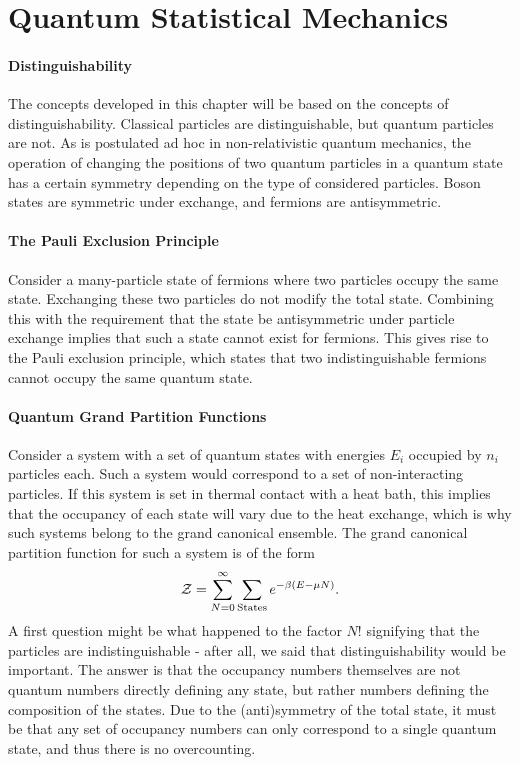 \section{Quantum Statistical Mechanics}

\paragraph{Distinguishability}
The concepts developed in this chapter will be based on the concepts of distinguishability. Classical particles are distinguishable, but quantum particles are not. As is postulated ad hoc in non-relativistic quantum mechanics, the operation of changing the positions of two quantum particles in a quantum state has a certain symmetry depending on the type of considered particles. Boson states are symmetric under exchange, and fermions are antisymmetric.

\paragraph{The Pauli Exclusion Principle}
Consider a many-particle state of fermions where two particles occupy the same state. Exchanging these two particles do not modify the total state. Combining this with the requirement that the state be antisymmetric under particle exchange implies that such a state cannot exist for fermions. This gives rise to the Pauli exclusion principle, which states that two indistinguishable fermions cannot occupy the same quantum state.

\paragraph{Quantum Grand Partition Functions}
Consider a system with a set of quantum states with energies $E_{i}$ occupied by $n_{i}$ particles each. Such a system would correspond to a set of non-interacting particles. If this system is set in thermal contact with a heat bath, this implies that the occupancy of each state will vary due to the heat exchange, which is why such systems belong to the grand canonical ensemble. The grand canonical partition function for such a system is of the form
\begin{align*}
	\mathcal{Z} = \sum\limits_{N = 0}^{\infty}\sum\limits_{\text{States}}e^{-\beta(E - \mu N)}.
\end{align*}
A first question might be what happened to the factor $N!$ signifying that the particles are indistinguishable - after all, we said that distinguishability would be important. The answer is that the occupancy numbers themselves are not quantum numbers directly defining any state, but rather numbers defining the composition of the states. Due to the (anti)symmetry of the total state, it must be that any set of occupancy numbers can only correspond to a single quantum state, and thus there is no overcounting.

